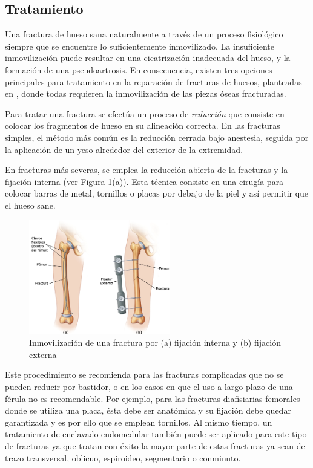 \subsection{Tratamiento}

Una fractura de hueso sana naturalmente a trav\'es de un proceso fisiol\'ogico siempre que se encuentre lo suficientemente inmovilizado. La insuficiente inmovilizaci\'on puede resultar en una cicatrizaci\'on inadecuada del hueso, y la formaci\'on de una pseudoartrosis. En consecuencia,  existen tres opciones principales para tratamiento en la reparaci\'on de fracturas de huesos, planteadas en \cite{MORO99}, donde todas requieren la inmovilizaci\'on de las piezas \'oseas fracturadas. 

Para tratar una fractura se efect\'ua un proceso de \textit{reducci\'on} que consiste en colocar los fragmentos de hueso en su alineaci\'on correcta. En las fracturas simples, el m\'etodo m\'as com\'un es la reducci\'on cerrada bajo anestesia, seguida por la aplicaci\'on de un yeso alrededor del exterior de la extremidad.

En fracturas m\'as severas, se emplea la reducci\'on abierta de la fracturas y la fijaci\'on interna (ver Figura \ref{fig:AOfijador}(a)). Esta t\'ecnica consiste en una cirug\'ia para colocar barras de metal, tornillos o placas por debajo de la piel y as\'i permitir que el hueso sane.
\begin{figure}[htb]
	\centering
		\includegraphics[width=0.55\textwidth]{images/fijadores.png}
		\caption{Inmovilizaci\'on de una fractura por (a) fijaci\'on interna y (b) fijaci\'on externa}
	\label{fig:AOfijador}
\end{figure}

Este procedimiento se recomienda para las fracturas complicadas que no se pueden reducir por bastidor, o en los casos en que el uso a largo plazo de una f\'erula no es recomendable. Por ejemplo, para las fracturas diafisiarias femorales donde se utiliza una placa, \'esta debe ser anat\'omica y su fijaci\'on debe quedar garantizada y es por ello que se emplean tornillos. Al mismo tiempo, un tratamiento de enclavado endomedular tambi\'en puede ser aplicado para este tipo de fracturas ya que tratan con \'exito la mayor parte de estas fracturas ya sean de trazo transversal, oblicuo, espiroideo, segmentario o conminuto.

